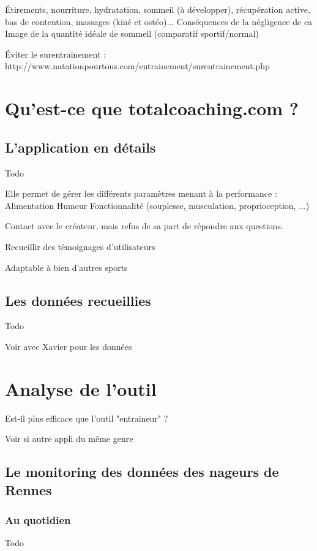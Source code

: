 Étirements, nourriture, hydratation, sommeil (à développer), récupération active, bas de contention, massages (kiné et ostéo)... Conséquences de la négligence de ca
Image de la quantité idéale de sommeil (comparatif sportif/normal)

Éviter le surentrainement : http://www.natationpourtous.com/entrainement/surentrainement.php


\clearpage
\section{Qu’est-ce que totalcoaching.com ?}
\subsection{L’application en détails}

Todo


Elle permet de gérer les différents paramètres menant à la performance :
Alimentation
Humeur
Fonctionnalité (souplesse, musculation, proprioception, ...)

Contact avec le créateur, mais refus de sa part de répondre aux questions.

Recueillir des témoignages d'utilisateurs

Adaptable à bien d'autres sports


\subsection{Les données recueillies}

Todo

Voir avec Xavier pour les données


\clearpage
\section{Analyse de l’outil}

Est-il plus efficace que l’outil "entraineur" ?

Voir si autre appli du même genre

\subsection{Le monitoring des données des nageurs de Rennes}
\subsubsection{Au quotidien}

Todo


